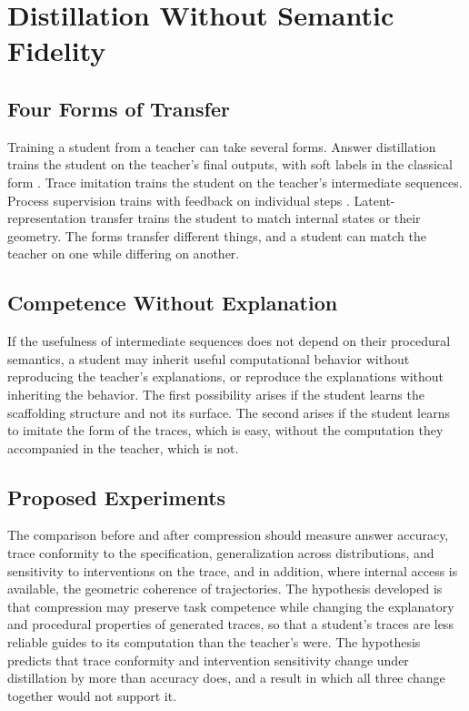 \chapter{Distillation Without Semantic Fidelity}
\label{ch:distillation}

\section{Four Forms of Transfer}

Training a student from a teacher can take several forms. Answer distillation trains the student on the teacher's final outputs, with soft labels in the classical form \cite{hinton2015}. Trace imitation trains the student on the teacher's intermediate sequences. Process supervision trains with feedback on individual steps \cite{lightman2023}. Latent-representation transfer trains the student to match internal states or their geometry. The forms transfer different things, and a student can match the teacher on one while differing on another.

\section{Competence Without Explanation}

If the usefulness of intermediate sequences does not depend on their procedural semantics, a student may inherit useful computational behavior without reproducing the teacher's explanations, or reproduce the explanations without inheriting the behavior. The first possibility arises if the student learns the scaffolding structure and not its surface. The second arises if the student learns to imitate the form of the traces, which is easy, without the computation they accompanied in the teacher, which is not.

\section{Proposed Experiments}

The comparison before and after compression should measure answer accuracy, trace conformity to the specification, generalization across distributions, and sensitivity to interventions on the trace, and in addition, where internal access is available, the geometric coherence of trajectories. The hypothesis developed is that compression may preserve task competence while changing the explanatory and procedural properties of generated traces, so that a student's traces are less reliable guides to its computation than the teacher's were. The hypothesis predicts that trace conformity and intervention sensitivity change under distillation by more than accuracy does, and a result in which all three change together would not support it.

